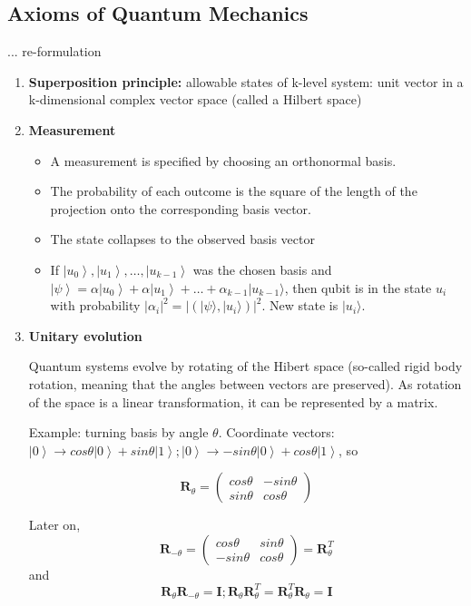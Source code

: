 \documentclass{scrartcl}
\newcommand{\ket}[1]{\left| #1 \right>} %
\begin{document}
\subsection{Axioms of Quantum Mechanics}
\label{sec:5-2}
... re-formulation
\begin{enumerate}
\item {\bf Superposition principle: } allowable states of k-level system: unit
  vector in a k-dimensional complex vector space (called a Hilbert space)

\item {\bf Measurement}

  \begin{itemize}
  \item A measurement is specified by choosing an orthonormal basis.
  \item The probability of each outcome is the square of the length of the
    projection onto the corresponding basis vector.
  \item The state collapses to the observed basis vector
  \item If $\ket{u_0}, \ket{u_1}, \dots, \ket{u_{k-1}}$ was the chosen basis and
    $\ket\psi = \alpha \ket{u_0} + \alpha \ket{u_1} + \dots + \alpha_{k-1} |
    u_{k-1}\rangle$, then qubit is in the state $u_i$ with probability
    $|\alpha_i|^2 = |(|\psi \rangle,|u_i\rangle)|^2$. New state is
    $|u_i\rangle$.
  \end{itemize}


\item {\bf Unitary evolution}

  Quantum systems evolve by rotating of the Hibert space (so-called rigid body
  rotation, meaning that the angles between vectors are preserved). As rotation
  of the space is a linear transformation, it can be represented by a matrix.

  Example: turning basis by angle $\theta$. Coordinate vectors: $\ket0 \to cos
  \theta \ket0 + sin \theta \ket1;\ket0 \to - sin \theta \ket0 + cos \theta
  \ket1$, so

\[\mathbf{R}_\theta = \left( \begin{array}{cc} cos \theta & -sin \theta \\ sin
    \theta & cos \theta \end{array}  \right)\]

Later on, \[ \mathbf{R}_{- \theta} = \left( \begin{array}{cc} cos \theta & sin
    \theta \\ -sin \theta & cos \theta \end{array} \right) =
\mathbf{R}_\theta^T \] and \[ \mathbf{R}_\theta \mathbf{R}_{-\theta} =
\mathbf{I}; \mathbf{R}_\theta \mathbf{R}_{\theta}^T = \mathbf{R}_\theta^T
\mathbf{R}_{\theta} = \mathbf{I} \]
\end{enumerate}
\end{document}
